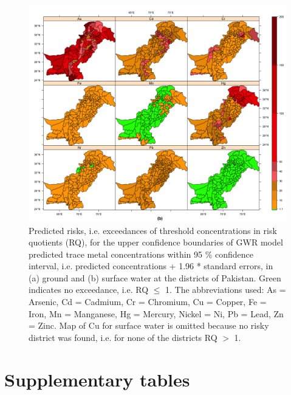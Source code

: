 \begin{figure}[hp!]
  \centering
  \captionsetup{width=1.1\textwidth}
  \hspace{-2.0cm} \includegraphics[width=1.1\textwidth]{Figures/Fig_D_6_b.png}
  \caption{Predicted risks, i.e. exceedances of threshold concentrations in risk quotients (RQ), for the upper confidence boundaries of GWR model predicted trace metal concentrations within 95 \% confidence interval, i.e. predicted concentrations + 1.96 * standard errors, in (a) ground and (b) surface water at the districts of Pakistan. Green indicates no exceedance, i.e. RQ $\leq$ 1. The abbreviations used: As = Arsenic, Cd = Cadmium, Cr = Chromium, Cu = Copper, Fe = Iron, Mn = Manganese, Hg = Mercury, Nickel = Ni, Pb = Lead, Zn = Zinc. Map of Cu for surface water is omitted because no risky district was found, i.e. for none of the districts RQ $>$ 1.}
  \label{Fig_D_6_b}
\end{figure}

\section{Supplementary tables}
\label{Supplementary tables}

\newpage


